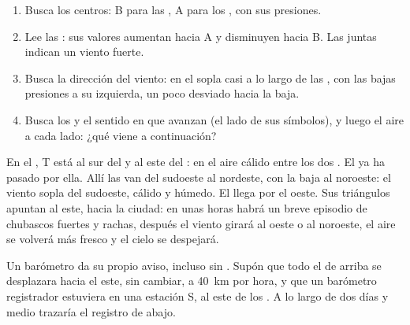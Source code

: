 \begin{method}
\begin{enumerate}
  \item Busca los centros: B para las , A para los ,
        con sus presiones.
  \item Lee las : sus valores aumentan hacia A y disminuyen hacia
        B. Las  juntas indican un viento fuerte.
  \item Busca la dirección del viento: en el  sopla casi a
        lo largo de las , con las bajas presiones a su izquierda,
        un poco desviado hacia la baja.
  \item Busca los  y el sentido en que avanzan (el lado de sus
        símbolos), y luego el aire a cada lado: ¿qué viene a continuación?
\end{enumerate}
\end{method}

\begin{example}
En el , T está al sur del  y al este del : en
el aire cálido entre los dos . El  ya ha pasado por
ella. Allí las  van del sudoeste al nordeste, con la baja al
noroeste: el viento sopla del sudoeste, cálido y húmedo. El 
llega por el oeste. Sus triángulos apuntan al este, hacia la ciudad: en
unas horas habrá un breve episodio de chubascos fuertes y rachas, después
el viento girará al oeste o al noroeste, el aire se volverá más fresco y el
cielo se despejará.
\end{example}

Un barómetro da su propio aviso, incluso sin . Supón que todo el 
de arriba se desplazara hacia el este, sin cambiar, a \qty{40}{km} por
hora, y que un barómetro registrador estuviera en una estación S, al este
de los . A lo largo de dos días y medio trazaría el registro de
abajo.

